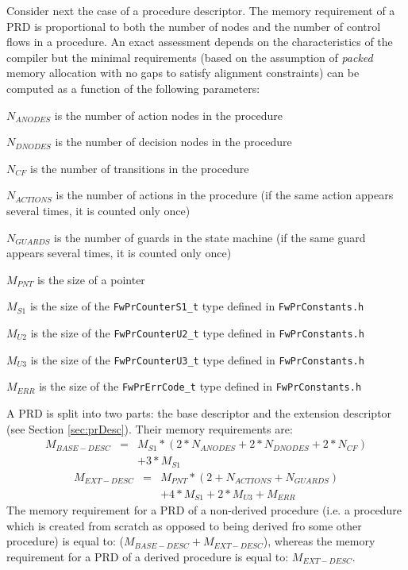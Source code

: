 \documentclass[manual]{../fwprofile}
\begin{document}
Consider next the case of a procedure descriptor.
The memory requirement of a PRD is proportional to both the number of nodes and the number of control flows
in a procedure. An exact assessment depends on the characteristics of the compiler but the minimal requirements 
(based on the assumption of \emph{packed} memory allocation with no gaps to satisfy alignment constraints) 
can be computed as a function of the following parameters:

\begin{fw_itemize}
\item {$N_{ANODES}$} is the number of action nodes in the procedure
\item {$N_{DNODES}$} is the number of decision nodes in the procedure
\item {$N_{CF}$} is the number of transitions in the procedure
\item {$N_{ACTIONS}$} is the number of actions in the procedure (if the same action appears several times, it is
counted only once)
\item {$N_{GUARDS}$} is the number of guards in the state machine (if the same guard appears several times, it is counted 
only once)
\item {$M_{PNT}$} is the size of a pointer 
\item {$M_{S1}$} is the size of the \texttt{FwPrCounterS1\_t} type defined in \texttt{FwPrConstants.h} 
\item {$M_{U2}$} is the size of the \texttt{FwPrCounterU2\_t} type defined in \texttt{FwPrConstants.h} 
\item {$M_{U3}$} is the size of the \texttt{FwPrCounterU3\_t} type defined in \texttt{FwPrConstants.h} 
\item {$M_{ERR}$} is the size of the \texttt{FwPrErrCode\_t} type defined in \texttt{FwPrConstants.h} 
\end{fw_itemize}

A PRD is split into two parts: the base descriptor and the extension descriptor (see Section \ref{sec:prDesc}). 
Their memory requirements are:
\begin{eqnarray*}
M_{BASE-DESC} & = & M_{S1} * (2 * N_{ANODES} + 2 * N_{DNODES} + 2 * N_{CF}) \\
              &   & + 3 * M_{S1} 
\end{eqnarray*}
\begin{eqnarray*}
M_{EXT-DESC} & = & M_{PNT} * (2 + N_{ACTIONS} + N_{GUARDS}) \\
             &   & + 4 * M_{S1} + 2 * M_{U3} + M_{ERR}
\end{eqnarray*}
The memory requirement for a PRD of a non-derived procedure (i.e. a procedure which 
is created from scratch as opposed to being derived fro some other procedure) is equal to: 
($M_{BASE-DESC} + M_{EXT-DESC}$), whereas the memory requirement for a PRD of a derived procedure
is equal to: $M_{EXT-DESC}$.
\end{document}
